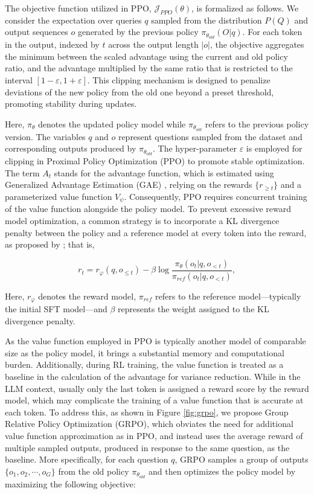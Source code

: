 \begin{itemize}[topsep=0pt]
\begin{itemize}[topsep=0pt]
The objective function utilized in PPO, $\mathcal{J}_{PPO}(\theta)$, is formalized as follows. We consider the expectation over queries $q$ sampled from the distribution $P(Q)$ and output sequences $o$ generated by the previous policy $\pi_{\theta_{old}}(O|q)$. For each token in the output, indexed by $t$ across the output length $|o|$, the objective aggregates the minimum between the scaled advantage using the current and old policy ratio, and the advantage multiplied by the same ratio that is restricted to the interval $[1-\varepsilon, 1+\varepsilon]$. This clipping mechanism is designed to penalize deviations of the new policy from the old one beyond a preset threshold, promoting stability during updates.

Here, $\pi_{\theta}$ denotes the updated policy model while $\pi_{\theta_{old}}$ refers to the previous policy version. The variables $q$ and $o$ represent questions sampled from the dataset and corresponding outputs produced by $\pi_{\theta_{old}}$. The hyper-parameter $\varepsilon$ is employed for clipping in Proximal Policy Optimization (PPO) to promote stable optimization. The term $A_t$ stands for the advantage function, which is estimated using Generalized Advantage Estimation (GAE) \citep{gae}, relying on the rewards $\{r_{\ge t}\}$ and a parameterized value function $V_{\psi}$. Consequently, PPO requires concurrent training of the value function alongside the policy model. To prevent excessive reward model optimization, a common strategy is to incorporate a KL divergence penalty between the policy and a reference model at every token into the reward, as proposed by \citep{ouyang2022training}; that is,

\begin{equation}
    r_{t} = r_\varphi(q, o_{\le t}) - \beta \log\frac{\pi_{\theta}(o_{t}|q, o_{<t})}{\pi_{ref}(o_{t}|q, o_{<t})},
\label{eq:PPO-reward}
\end{equation}

Here, $r_\varphi$ denotes the reward model, $\pi_{ref}$ refers to the reference model—typically the initial SFT model—and $\beta$ represents the weight assigned to the KL divergence penalty.

As the value function employed in PPO is typically another model of comparable size as the policy model, it brings a substantial memory and computational burden. Additionally, during RL training, the value function is treated as a baseline in the calculation of the advantage for variance reduction. While in the LLM context, usually only the last token is assigned a reward score by the reward model, which may complicate the training of a value function that is accurate at each token. To address this, as shown in Figure \ref{fig:grpo}, we propose Group Relative Policy Optimization (GRPO), which obviates the need for additional value function approximation as in PPO, and instead uses the average reward of multiple sampled outputs, produced in response to the same question, as the baseline. More specifically, for each question $q$, GRPO samples a group of outputs $\{o_1, o_2, \cdots, o_G\}$  from the old policy  $\pi_{\theta_{old}}$  and then optimizes the policy model by maximizing the following objective:


\end{itemize}
\end{itemize}
